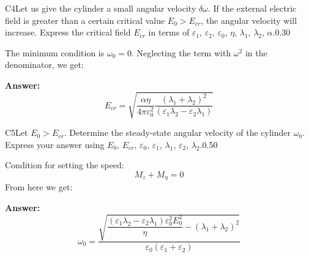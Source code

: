 \documentclass[11pt,a4paper]{article}
\begin{document}
\begin{solcard}{C4}{Let us give the cylinder a small angular velocity $\delta \omega$. If the external electric field is greater than a certain critical value $E_0 > E_{cr}$, the angular velocity will increase. Express the critical field $E_{cr}$ in terms of $\varepsilon_1$, $\varepsilon_2$, $\varepsilon_0$, $\eta$, $\lambda_1$, $\lambda_2$, $\alpha$.}{0.30}

The minimum condition is $\omega_0=0$. Neglecting the term with $\omega^2$ in the denominator, we get:

\par\smallskip\noindent\textbf{Answer:} \[E_{cr}=\sqrt{\dfrac{\alpha\eta}{4\pi\varepsilon_0^2}\dfrac{(\lambda_1+\lambda_2)^2}{(\varepsilon_1\lambda_2-\varepsilon_2\lambda_1)}}\]
\end{solcard}

\begin{solcard}{C5}{Let $E_0 > E_{cr}$. Determine the steady-state angular velocity of the cylinder $\omega_0$. Express your answer using $E_0$, $E_{cr}$, $\varepsilon_0$, $\varepsilon_1$, $\lambda_1$, $\varepsilon_2$, $\lambda_2$.}{0.50}

Condition for setting the speed: \[M_z+M_{\eta}=0\]From here we get:

\par\smallskip\noindent\textbf{Answer:} \[\omega_0=\dfrac{\sqrt{\dfrac{(\varepsilon_1\lambda_2-\varepsilon_2\lambda_1)\varepsilon_0^2E_0^2}{\eta}-(\lambda_1+\lambda_2)^2}}{\varepsilon_0(\varepsilon_1+\varepsilon_2)}\]
\end{solcard}
\end{document}
